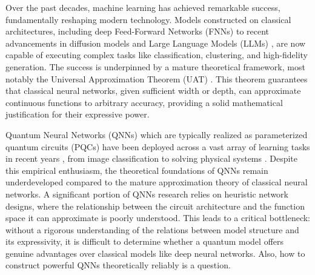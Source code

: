 \documentclass{article}
\theoremstyle{plain}
\theoremstyle{definition}
\theoremstyle{remark}
\begin{document}
Over the past decades, machine learning has achieved remarkable success, fundamentally reshaping modern technology. Models constructed on classical architectures, including deep Feed-Forward Networks (FNNs) \cite{Rumelhart1986,Bebis1994,Eldan2015,qamar2023,aftabi2025} to recent advancements in diffusion models \cite{diffusion2015,ho2020,song2021,he2025} and Large Language Models (LLMs) \cite{vaswani2017,brown2020,ouyang2022,naveed2025}, are now capable of executing complex tasks like classification, clustering, and high-fidelity generation. The success is underpinned by a mature theoretical framework, most notably the Universal Approximation Theorem (UAT) \cite{cybenko1989,hornik1989}. This theorem guarantees that classical neural networks, given sufficient width or depth, can approximate continuous functions to arbitrary accuracy, providing a solid mathematical justification for their expressive power.

Quantum Neural Networks (QNNs) which are typically realized as parameterized quantum circuits (PQCs) have been deployed across a vast array of learning tasks in recent years \cite{schuld2014,killoran2019,jia2019,abbas2021}, from image classification \cite{farhi2018,schuld2019,mathur2021,shi2024} to solving physical systems \cite{li2017,kandala2017,yuan2019,lubasch2020,kyriienko2021}. Despite this empirical enthusiasm, the theoretical foundations of QNNs remain underdeveloped compared to the mature approximation theory of classical neural networks. A significant portion of QNNs research relies on heuristic network designs, where the relationship between the circuit architecture and the function space it can approximate is poorly understood. This leads to a critical bottleneck: without a rigorous understanding of the relations between model structure and its expressivity, it is difficult to determine whether a quantum model offers genuine advantages over classical models like deep neural networks. Also, how to construct powerful QNNs theoretically reliably is a question.
\end{document}
